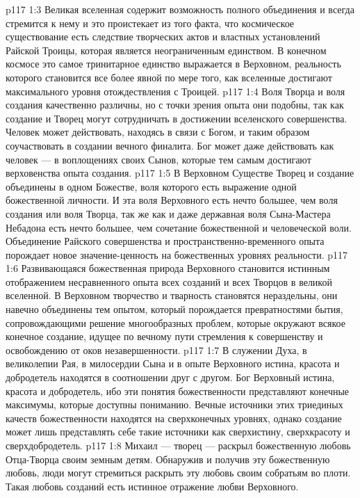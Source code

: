 \vs p117 1:3 Великая вселенная содержит возможность полного объединения и всегда стремится к нему и это проистекает из того факта, что космическое существование есть следствие творческих актов и властных установлений Райской Троицы, которая является неограниченным единством. В конечном космосе это самое тринитарное единство выражается в Верховном, реальность которого становится все более явной по мере того, как вселенные достигают максимального уровня отождествления с Троицей.
\vs p117 1:4 \pc Воля Творца и воля создания качественно различны, но с точки зрения опыта они подобны, так как создание и Творец могут сотрудничать в достижении вселенского совершенства. Человек может действовать, находясь в связи с Богом, и таким образом соучаствовать в создании вечного финалита. Бог может даже действовать как человек --- в воплощениях своих Сынов, которые тем самым достигают верховенства опыта создания.
\vs p117 1:5 В Верховном Существе Творец и создание объединены в одном Божестве, воля которого есть выражение одной божественной личности. И эта воля Верховного есть нечто большее, чем воля создания или воля Творца, так же как и даже державная воля Сына\hyp{}Мастера Небадона есть нечто большее, чем сочетание божественной и человеческой воли. Объединение Райского совершенства и пространственно\hyp{}временного опыта порождает новое значение\hyp{}ценность на божественных уровнях реальности.
\vs p117 1:6 Развивающаяся божественная природа Верховного становится истинным отображением несравненного опыта всех созданий и всех Творцов в великой вселенной. В Верховном творчество и тварность становятся нераздельны, они навечно объединены тем опытом, который порождается превратностями бытия, сопровождающими решение многообразных проблем, которые окружают всякое конечное создание, идущее по вечному пути стремления к совершенству и освобождению от оков незавершенности.
\vs p117 1:7 \pc В служении Духа, в великолепии Рая, в милосердии Сына и в опыте Верховного истина, красота и добродетель находятся в соотношении друг с другом. Бог Верховный  истина, красота и добродетель, ибо эти понятия божественности представляют конечные максимумы, которые доступны пониманию. Вечные источники этих триединых качеств божественности находятся на сверхконечных уровнях, однако создание может лишь представлять себе такие источники как сверхистину, сверхкрасоту и сверхдобродетель.
\vs p117 1:8 Михаил --- творец --- раскрыл божественную любовь Отца\hyp{}Творца своим земным детям. Обнаружив и получив эту божественную любовь, люди могут стремиться раскрыть эту любовь своим собратьям во плоти. Такая любовь созданий есть истинное отражение любви Верховного.
